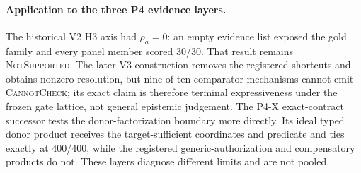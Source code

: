 \paragraph{Application to the three P4 evidence layers.}
The historical V2 H3 axis had $\rho_a=0$: an empty evidence list exposed the
gold family and every panel member scored 30/30.  That result remains
\textsc{NotSupported}.  The later V3 construction removes the registered
shortcuts and obtains nonzero resolution, but nine of ten comparator mechanisms
cannot emit \textsc{CannotCheck}; its exact claim is therefore terminal
expressiveness under the frozen gate lattice, not general epistemic judgement.
The P4-X exact-contract successor tests the donor-factorization boundary more
directly.  Its ideal typed donor product receives the target-sufficient
coordinates and predicate and ties exactly at 400/400, while the registered
generic-authorization and compensatory products do not.  These layers diagnose
different limits and are not pooled.
